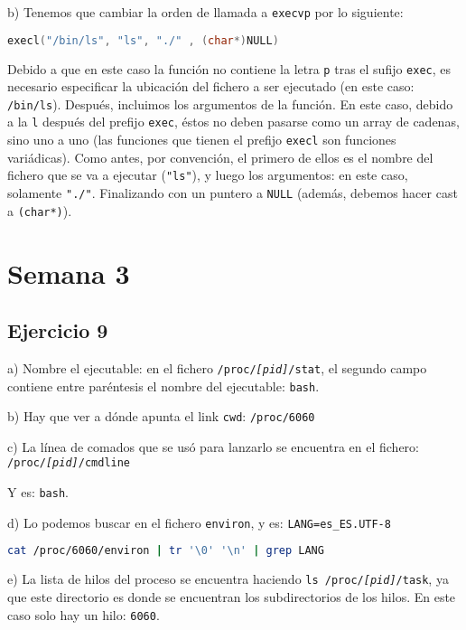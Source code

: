 \documentclass{article}
\begin{document}
b) Tenemos que cambiar la orden de llamada a \texttt{execvp} por lo siguiente:

\begin{lstlisting}[language=C]
    execl("/bin/ls", "ls", "./" , (char*)NULL)
\end{lstlisting}

Debido a que en este caso la función no contiene la letra \texttt{p} tras el sufijo \texttt{exec}, es necesario especificar la ubicación del fichero a ser ejecutado (en este caso: \texttt{/bin/ls}). Después, incluimos los argumentos de la función. En este caso, debido a la \texttt{l} después del prefijo \texttt{exec}, éstos no deben pasarse como un array de cadenas, sino uno a uno (las funciones que tienen el prefijo \texttt{execl} son funciones variádicas). Como antes, por convención, el primero de ellos es el nombre del fichero que se va a ejecutar (\texttt{"ls"}), y luego los argumentos: en este caso, solamente \texttt{"./"}. Finalizando con un puntero a \texttt{NULL} (además, debemos hacer cast a \texttt{(char*)}).

\section*{Semana 3}

\subsection*{Ejercicio 9}

a) Nombre el ejecutable: en el fichero \texttt{/proc/\textit{[pid]}/stat}, el segundo campo contiene entre paréntesis el nombre del ejecutable: \texttt{bash}.

b) Hay que ver a dónde apunta el link \texttt{cwd}: \texttt{/proc/6060}

c) La línea de comados que se usó para lanzarlo se encuentra en el fichero: \texttt{/proc/\textit{[pid]}/cmdline}

Y es: \texttt{bash}.

d) Lo podemos buscar en el fichero \texttt{environ}, y es: \texttt{LANG=es\_ES.UTF-8}
\begin{lstlisting}[language=bash]
    cat /proc/6060/environ | tr '\0' '\n' | grep LANG
\end{lstlisting}

e) La lista de hilos del proceso se encuentra haciendo \texttt{ls /proc/\textit{[pid]}/task}, ya que este directorio es donde se encuentran los subdirectorios de los hilos. En este caso solo hay un hilo: \texttt{6060}.
\end{document}
